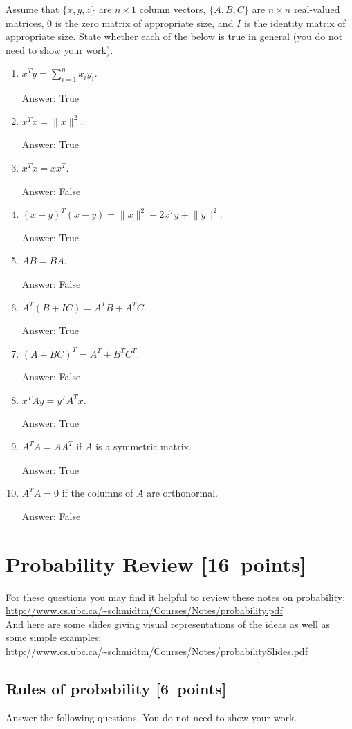 \documentclass{article}
\newcommand{\blu}[1]{{\textcolor{blu}{#1}}}
\newcommand{\gre}[1]{\textcolor{gre}{#1}}
\newcommand\ans[1]{\par\gre{Answer: #1}}
\let\ask\blu
\newcommand\pts[1]{\textcolor{pointscolour}{[#1~points]}}
\newcommand{\norm}[1]{\lVert #1 \rVert}
\begin{document}
  Assume that $\{x,y,z\}$ are $n \times 1$ column vectors, $\{A,B,C\}$ are $n \times n$ real-valued matrices, $0$ is the zero matrix of appropriate size, and $I$ is the identity matrix of appropriate size. \ask{State whether each of the below is true in general} (you do not need to show your work).

  \begin{enumerate}
  \item $x^Ty = \sum_{i=1}^n x_iy_i$.
  \ans{True}
  \item $x^Tx = \norm{x}^2$.
  \ans{True}
  \item $x^Tx = xx^T$.
  \ans{False}
  \item $(x-y)^T(x-y) = \norm{x}^2 - 2x^Ty + \norm{y}^2$.
  \ans{True}
  \item $AB=BA$.
  \ans{False}
  \item $A^T(B + IC) = A^TB + A^TC$.
  \ans{True}
  \item $(A + BC)^T = A^T + B^TC^T$.
  \ans{False}
  \item $x^TAy = y^TA^Tx$.
  \ans{True}
  \item $A^TA = AA^T$ if $A$ is a symmetric matrix.
  \ans{True}
  \item $A^TA = 0$ if the columns of $A$ are orthonormal.
  \ans{False}
  \end{enumerate}


  \clearpage 
  \section{Probability Review \pts{16}}


  For these questions you may find it helpful to review these notes on probability:\\
  \url{http://www.cs.ubc.ca/~schmidtm/Courses/Notes/probability.pdf}\\
  And here are some slides giving visual representations of the ideas as well as some simple examples:\\
  \url{http://www.cs.ubc.ca/~schmidtm/Courses/Notes/probabilitySlides.pdf}

  \subsection{Rules of probability \pts{6}}

  \ask{Answer the following questions.} You do not need to show your work.

\end{document}
